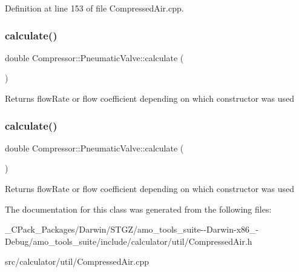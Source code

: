 Definition at line 153 of file Compressed\+Air.\+cpp.

\mbox{\label{class_compressor_1_1_pneumatic_valve_aa9e11ab6f1e75730519a69fccfaa53c2}} 
\subsubsection{\texorpdfstring{calculate()}{calculate()}\hspace{0.1cm}{\footnotesize\ttfamily [2/3]}}
{\footnotesize\ttfamily double Compressor\+::\+Pneumatic\+Valve\+::calculate (\begin{DoxyParamCaption}{ }\end{DoxyParamCaption})}

\begin{DoxyReturn}{Returns}
flow\+Rate or flow coefficient depending on which constructor was used 
\end{DoxyReturn}
\mbox{\label{class_compressor_1_1_pneumatic_valve_aa9e11ab6f1e75730519a69fccfaa53c2}} 
\subsubsection{\texorpdfstring{calculate()}{calculate()}\hspace{0.1cm}{\footnotesize\ttfamily [3/3]}}
{\footnotesize\ttfamily double Compressor\+::\+Pneumatic\+Valve\+::calculate (\begin{DoxyParamCaption}{ }\end{DoxyParamCaption})}

\begin{DoxyReturn}{Returns}
flow\+Rate or flow coefficient depending on which constructor was used 
\end{DoxyReturn}


The documentation for this class was generated from the following files\+:\begin{DoxyCompactItemize}
\item 
\+\_\+\+C\+Pack\+\_\+\+Packages/\+Darwin/\+S\+T\+G\+Z/amo\+\_\+tools\+\_\+suite-\/-\/\+Darwin-\/x86\+\_-\/\+Debug/amo\+\_\+tools\+\_\+suite/include/calculator/util/Compressed\+Air.\+h\item 
src/calculator/util/Compressed\+Air.\+cpp\end{DoxyCompactItemize}
